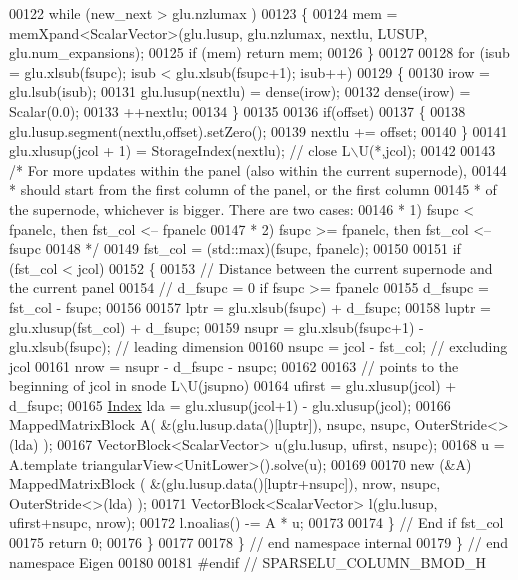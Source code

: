 \begin{DoxyCode}
00122   \textcolor{keywordflow}{while} (new\_next > glu.nzlumax )
00123   \{
00124     mem = memXpand<ScalarVector>(glu.lusup, glu.nzlumax, nextlu, LUSUP, glu.num\_expansions);  
00125     \textcolor{keywordflow}{if} (mem) \textcolor{keywordflow}{return} mem; 
00126   \}
00127   
00128   \textcolor{keywordflow}{for} (isub = glu.xlsub(fsupc); isub < glu.xlsub(fsupc+1); isub++)
00129   \{
00130     irow = glu.lsub(isub);
00131     glu.lusup(nextlu) = dense(irow);
00132     dense(irow) = Scalar(0.0); 
00133     ++nextlu; 
00134   \}
00135   
00136   \textcolor{keywordflow}{if}(offset)
00137   \{
00138     glu.lusup.segment(nextlu,offset).setZero();
00139     nextlu += offset;
00140   \}
00141   glu.xlusup(jcol + 1) = StorageIndex(nextlu);  \textcolor{comment}{// close L\(\backslash\)U(*,jcol); }
00142   
00143   \textcolor{comment}{/* For more updates within the panel (also within the current supernode),}
00144 \textcolor{comment}{   * should start from the first column of the panel, or the first column}
00145 \textcolor{comment}{   * of the supernode, whichever is bigger. There are two cases:}
00146 \textcolor{comment}{   *  1) fsupc < fpanelc, then fst\_col <-- fpanelc}
00147 \textcolor{comment}{   *  2) fsupc >= fpanelc, then fst\_col <-- fsupc}
00148 \textcolor{comment}{   */}
00149   fst\_col = (std::max)(fsupc, fpanelc); 
00150   
00151   \textcolor{keywordflow}{if} (fst\_col  < jcol)
00152   \{
00153     \textcolor{comment}{// Distance between the current supernode and the current panel}
00154     \textcolor{comment}{// d\_fsupc = 0 if fsupc >= fpanelc}
00155     d\_fsupc = fst\_col - fsupc; 
00156     
00157     lptr = glu.xlsub(fsupc) + d\_fsupc; 
00158     luptr = glu.xlusup(fst\_col) + d\_fsupc; 
00159     nsupr = glu.xlsub(fsupc+1) - glu.xlsub(fsupc); \textcolor{comment}{// leading dimension}
00160     nsupc = jcol - fst\_col; \textcolor{comment}{// excluding jcol }
00161     nrow = nsupr - d\_fsupc - nsupc; 
00162     
00163     \textcolor{comment}{// points to the beginning of jcol in snode L\(\backslash\)U(jsupno) }
00164     ufirst = glu.xlusup(jcol) + d\_fsupc; 
00165     \hyperlink{namespace_eigen_a62e77e0933482dafde8fe197d9a2cfde}{Index} lda = glu.xlusup(jcol+1) - glu.xlusup(jcol);
00166     MappedMatrixBlock A( &(glu.lusup.data()[luptr]), nsupc, nsupc, OuterStride<>(lda) );
00167     VectorBlock<ScalarVector> u(glu.lusup, ufirst, nsupc); 
00168     u = A.template triangularView<UnitLower>().solve(u); 
00169     
00170     \textcolor{keyword}{new} (&A) MappedMatrixBlock ( &(glu.lusup.data()[luptr+nsupc]), nrow, nsupc, OuterStride<>(lda) );
00171     VectorBlock<ScalarVector> l(glu.lusup, ufirst+nsupc, nrow); 
00172     l.noalias() -= A * u;
00173     
00174   \} \textcolor{comment}{// End if fst\_col}
00175   \textcolor{keywordflow}{return} 0; 
00176 \}
00177 
00178 \} \textcolor{comment}{// end namespace internal}
00179 \} \textcolor{comment}{// end namespace Eigen}
00180 
00181 \textcolor{preprocessor}{#endif // SPARSELU\_COLUMN\_BMOD\_H}
\end{DoxyCode}
